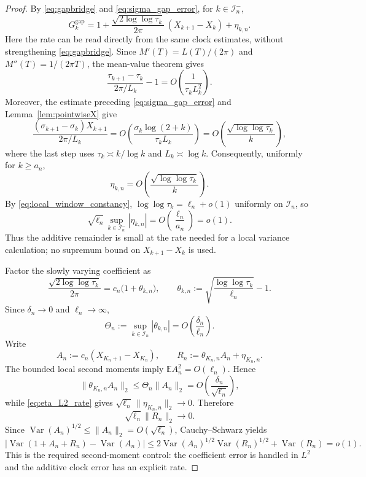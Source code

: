 \documentclass[pdflatex,sn-mathphys-num]{sn-jnl}
\numberwithin{equation}{section}
\theoremstyle{thmstyleone}
\theoremstyle{thmstylethree}
\theoremstyle{thmstyletwo}
\newcommand{\E}{\mathbb E}
\newcommand{\Var}{\operatorname{Var}}
\newcommand{\1}{\mathbf 1}
\begin{document}
\begin{proof}
By \eqref{eq:gapbridge} and \eqref{eq:sigma_gap_error}, for
$k\in\mathcal I_n^-$,
\begin{equation}
 G_k^{\mathrm{gap}}
 =1+\frac{\sqrt{2\log\log\tau_k}}{2\pi}\,(X_{k+1}-X_k)+\eta_{k,n}.
\label{eq:gap_local_exact}
\end{equation}
Here the rate can be read directly from the same clock estimates, without
strengthening \eqref{eq:gapbridge}.  Since
$M'(T)=L(T)/(2\pi)$ and $M''(T)=1/(2\pi T)$, the mean-value theorem gives
\[
 \frac{\tau_{k+1}-\tau_k}{2\pi/L_k}-1
 =O\!\left(\frac1{\tau_kL_k^2}\right).
\]
Moreover, the estimate preceding \eqref{eq:sigma_gap_error} and
Lemma~\ref{lem:pointwiseX} give
\[
 \frac{(\sigma_{k+1}-\sigma_k)X_{k+1}}{2\pi/L_k}
 =O\!\left(\frac{\sigma_k\log(2+k)}{\tau_kL_k}\right)
 =O\!\left(\frac{\sqrt{\log\log\tau_k}}{k}\right),
\]
where the last step uses $\tau_k\asymp k/\log k$ and $L_k\asymp\log k$.
Consequently, uniformly for $k\ge a_n$,
\[
 \eta_{k,n}=O\!\left(\frac{\sqrt{\log\log\tau_k}}{k}\right).
\]
By \eqref{eq:local_window_constancy},
$\log\log\tau_k=\ell_n+o(1)$ uniformly on $\mathcal I_n$, so
\begin{equation}
 \sqrt{\ell_n}\,
 \sup_{k\in\mathcal I_n^-}|\eta_{k,n}|
 =O\!\left(\frac{\ell_n}{a_n}\right)=o(1).
\label{eq:eta_L2_rate}
\end{equation}
Thus the additive remainder is small at the rate needed for a local variance
calculation; no supremum bound on $X_{k+1}-X_k$ is used.

Factor the slowly varying coefficient as
\begin{equation}
 \frac{\sqrt{2\log\log\tau_k}}{2\pi}
 =c_n\bigl(1+\theta_{k,n}\bigr),
 \qquad
 \theta_{k,n}
 :=\sqrt{\frac{\log\log\tau_k}{\ell_n}}-1.
\label{eq:coeff_factorization}
\end{equation}
Since $\delta_n\to0$ and $\ell_n\to\infty$,
\begin{equation}
 \Theta_n:=\sup_{k\in\mathcal I_n}|\theta_{k,n}|
 =O\!\left(\frac{\delta_n}{\ell_n}\right).
\label{eq:theta_uniform}
\end{equation}
Write
\[
 A_n:=c_n(X_{K_n+1}-X_{K_n}),
 \qquad
 R_n:=\theta_{K_n,n}A_n+\eta_{K_n,n}.
\]
The bounded local second moments imply
$\E A_n^2=O(\ell_n)$.  Hence
\[
 \|\theta_{K_n,n}A_n\|_2
 \le \Theta_n\|A_n\|_2
 =O\!\left(\frac{\delta_n}{\sqrt{\ell_n}}\right),
\]
while \eqref{eq:eta_L2_rate} gives
$\sqrt{\ell_n}\,\|\eta_{K_n,n}\|_2\to0$.  Therefore
\begin{equation}
 \sqrt{\ell_n}\,\|R_n\|_2\longrightarrow0.
\label{eq:R_L2_rate}
\end{equation}
Since $\Var(A_n)^{1/2}\le\|A_n\|_2=O(\sqrt{\ell_n})$,
Cauchy--Schwarz yields
\begin{equation}
 \bigl|\Var(1+A_n+R_n)-\Var(A_n)\bigr|
 \le
 2\Var(A_n)^{1/2}\Var(R_n)^{1/2}+\Var(R_n)
 =o(1).
\label{eq:cross_term}
\end{equation}
This is the required second-moment control: the coefficient error is handled
in $L^2$ and the additive clock error has an explicit rate.


\end{proof}
\end{document}
